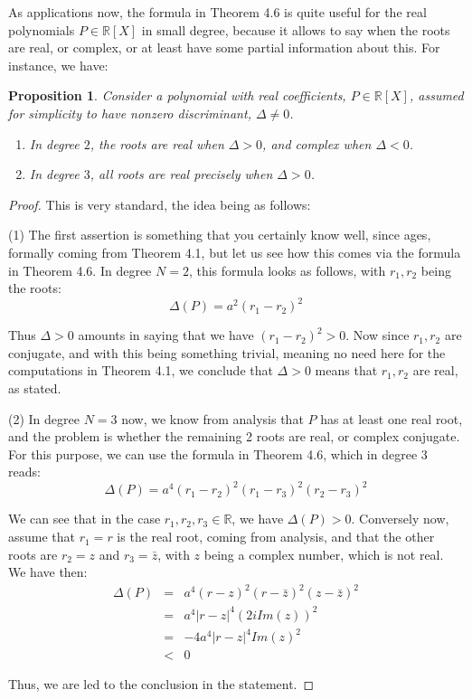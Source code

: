 \documentclass[12pt]{amsbook}
\newtheorem{proposition}[theorem]{Proposition}
\begin{document}
As applications now, the formula in Theorem 4.6 is quite useful for the real polynomials $P\in\mathbb R[X]$ in small degree, because it allows to say when the roots are real, or complex, or at least have some partial information about this. For instance, we have:


\begin{proposition}
Consider a polynomial with real coefficients, $P\in\mathbb R[X]$, assumed for simplicity to have nonzero discriminant, $\Delta\neq0$.
\begin{enumerate}
\item In degree $2$, the roots are real when $\Delta>0$, and complex when $\Delta<0$.

\item In degree $3$, all roots are real precisely when $\Delta>0$.
\end{enumerate}
\end{proposition}

\begin{proof}
This is very standard, the idea being as follows:

\medskip

(1) The first assertion is something that you certainly know well, since ages, formally coming from Theorem 4.1, but let us see how this comes via the formula in Theorem 4.6. In degree $N=2$, this formula looks as follows, with $r_1,r_2$ being the roots:
$$\Delta(P)=a^2(r_1-r_2)^2$$

Thus $\Delta>0$ amounts in saying that we have $(r_1-r_2)^2>0$. Now since $r_1,r_2$ are conjugate, and with this being something trivial, meaning no need here for the computations in Theorem 4.1, we conclude that $\Delta>0$ means that $r_1,r_2$ are real, as stated.

\medskip

(2) In degree $N=3$ now, we know from analysis that $P$ has at least one real root, and the problem is whether the remaining 2 roots are real, or complex conjugate. For this purpose, we can use the formula in Theorem 4.6, which in degree 3 reads:
$$\Delta(P)=a^4(r_1-r_2)^2(r_1-r_3)^2(r_2-r_3)^2$$

We can see that in the case $r_1,r_2,r_3\in\mathbb R$, we have $\Delta(P)>0$. Conversely now, assume that $r_1=r$ is the real root, coming from analysis, and that the other roots are $r_2=z$ and $r_3=\bar{z}$, with $z$ being a complex number, which is not real. We have then:
\begin{eqnarray*}
\Delta(P)
&=&a^4(r-z)^2(r-\bar{z})^2(z-\bar{z})^2\\
&=&a^4|r-z|^4(2i Im(z))^2\\
&=&-4a^4|r-z|^4Im(z)^2\\
&<&0
\end{eqnarray*}

Thus, we are led to the conclusion in the statement.
\end{proof}
\end{document}

